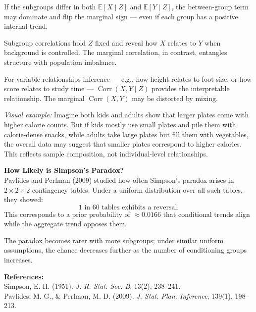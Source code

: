 \begin{technical}
If the subgroups differ in both \( \mathbb{E}[X \mid Z] \) and \( \mathbb{E}[Y \mid Z] \), the between-group term may dominate and flip the marginal sign — even if each group has a positive internal trend.

Subgroup correlations hold \( Z \) fixed and reveal how \( X \) relates to \( Y \) when background is controlled. The marginal correlation, in contrast, entangles structure with population imbalance.

For variable relationships inference — e.g., how height relates to foot size, or how score relates to study time — \( \operatorname{Corr}(X, Y \mid Z) \) provides the interpretable relationship. The marginal \( \operatorname{Corr}(X, Y) \) may be distorted by mixing.

\vspace{0.5em}
\noindent\textit{Visual example:} Imagine both kids and adults show that larger plates come with higher calorie counts. But if kids mostly use small plates and pile them with calorie-dense snacks, while adults take large plates but fill them with vegetables, the overall data may suggest that smaller plates correspond to higher calories. This reflects sample composition, not individual-level relationships.

\vspace{1em}
\noindent\textbf{How Likely is Simpson’s Paradox?}\\[0.5em]
Pavlides and Perlman (2009) studied how often Simpson’s paradox arises in \( 2 \times 2 \times 2 \) contingency tables. Under a uniform distribution over all such tables, they showed:
\[
\boxed{\text{1 in 60 tables exhibits a reversal.}}
\]
This corresponds to a prior probability of \( \approx 0.0166 \) that conditional trends align while the aggregate trend opposes them.

The paradox becomes rarer with more subgroups; under similar uniform assumptions, the chance decreases further as the number of conditioning groups increases.

\vspace{0.5em}
\noindent\textbf{References:}\\
{\footnotesize
Simpson, E. H. (1951). \textit{J. R. Stat. Soc. B}, 13(2), 238–241.\\
Pavlides, M. G., \& Perlman, M. D. (2009). \textit{J. Stat. Plan. Inference}, 139(1), 198–213.
}
\end{technical}
